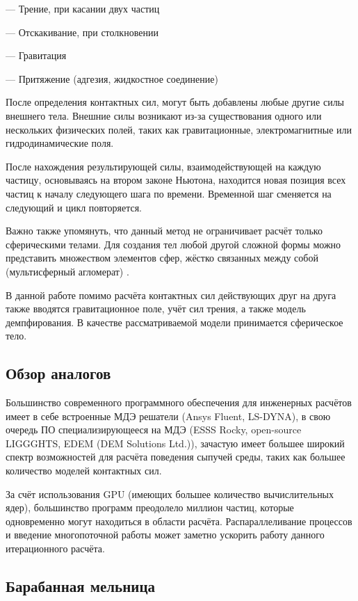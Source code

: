 \documentclass[a4paper]{article}
\begin{document}
--- Трение, при касании двух частиц

--- Отскакивание, при столкновении

--- Гравитация

--- Притяжение (адгезия, жидкостное соединение)

После определения контактных сил, могут быть добавлены любые другие силы внешнего тела. 
Внешние силы возникают из-за существования одного или нескольких физических полей, таких как гравитационные, электромагнитные или гидродинамические поля.

После нахождения результирующей силы, взаимодействующей на каждую частицу, основываясь на втором законе Ньютона, находится новая позиция всех частиц к началу следующего шага по времени.
Временной шаг сменяется на следующий и цикл повторяется.

Важно также упомянуть, что данный метод не ограничивает расчёт только сферическими телами. Для создания тел любой другой сложной формы можно представить множеством элементов сфер, жёстко связанных между собой (мультисферный агломерат) \cite{aglomerath}.

В данной работе помимо расчёта контактных сил действующих друг на друга также вводятся гравитационное поле, учёт сил трения, а также модель демпфирования. 
В качестве рассматриваемой модели принимается сферическое тело.

\subsection{Обзор аналогов}

Большинство современного программного обеспечения для инженерных расчётов имеет в себе встроенные МДЭ решатели (Ansys Fluent, LS-DYNA), в свою очередь ПО специализирующееся на МДЭ (ESSS Rocky, open-source LIGGGHTS, EDEM (DEM Solutions Ltd.)), зачастую имеет большее широкий спектр возможностей для расчёта поведения сыпучей среды, таких как большее количество моделей контактных сил.

За счёт использования GPU (имеющих большее количество вычислительных ядер), большинство программ преодолело миллион частиц, которые одновременно могут находиться в области расчёта. 
Распараллеливание процессов и введение многопоточной работы может заметно ускорить работу данного итерационного расчёта.

\subsection{Барабанная мельница}
\label{mill_theory}
\end{document}
